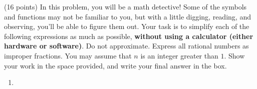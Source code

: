 \item (16 points) In this problem, you will be a math detective! Some of the symbols and functions may not be familiar to you, but with a little digging, reading, and observing, you'll be able to figure them out. Your task is to 
    simplify each of the following expressions as much as possible, \textbf{without
    using a calculator (either hardware or software)}. Do not approximate.
    Express all rational numbers as improper fractions.
    You may assume that $n$ is an integer greater than $1$.
    Show your work in the space provided, and write your final answer in the box.
 
    \begin{enumerate}
        \item \begin{enumerate}
  

\end{enumerate}
\end{enumerate}
